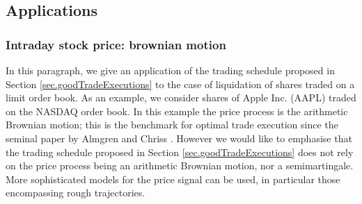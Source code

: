 \documentclass[10pt,a4paper]{article}
\begin{document}
\subsection{Applications}\label{sec.applications}

\subsubsection{Intraday stock price: brownian motion}
In this  paragraph, we give an application of the trading schedule proposed in Section \ref{sec.goodTradeExecutions} to the case of liquidation of shares traded on a limit order book. As an example, we consider shares of Apple Inc. (AAPL) traded on the NASDAQ order book. In this example the price process is the arithmetic Brownian motion; this is the benchmark for optimal trade execution since the seminal paper by Almgren and Chriss \cite{AC00opt}. However we would like to emphasise  that the trading schedule proposed in Section \ref{sec.goodTradeExecutions} does not rely on the price process being an arithmetic Brownian motion, nor a semimartingale. More sophisticated models for the price signal can be used, in particular those encompassing rough trajectories.
\end{document}
